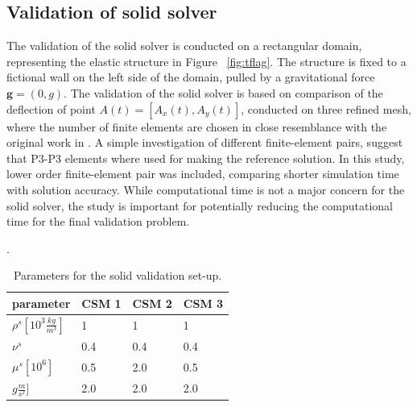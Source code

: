 \subsection{Validation of solid solver}
The validation of the solid solver is conducted on a rectangular domain, representing the elastic structure in Figure ~\ref{fig:tflag}.  The structure is fixed to a fictional wall on the left side of the domain, pulled by a gravitational force $\mathbf{g} = (0, g)$. The validation of the solid solver is based on comparison of the deflection of point $A(t) = [A_x(t), A_y(t)]$,  conducted on three refined mesh, where the number of finite elements are chosen in close resemblance with the original work in \cite{Hron2006}. A simple investigation of different finite-element pairs, suggest that P3-P3 elements where used for making the reference solution. In this study, lower order finite-element pair was included, comparing shorter simulation time with solution accuracy. While computational time is not a major concern for the solid solver, the study is important for potentially reducing the computational time for the final validation problem.
\begin{table}[h!]
\centering.
\label{my-label}
\begin{tabular}{ |p{3cm}||p{2cm}|p{2cm}|p{2cm}|  }
 \hline
 parameter              & CSM 1 & CSM 2 & CSM 3 \\
 \hline
$\rho^s [10^{3}\frac{kg}{m^3}]$ & 1    & 1    & 1    \\
$\nu^s $  & 0.4    & 0.4    & 0.4    \\
$\mu^s  [10^{6}]$  & 0.5    & 2.0    & 0.5    \\
$g  \frac{m}{s^2}]$  & 2.0    & 2.0    & 2.0    \\
\hline
\end{tabular}
\caption{Parameters for the solid validation set-up.}
\end{table}
